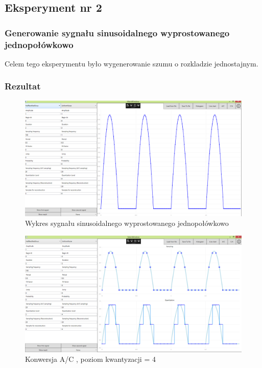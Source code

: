 \documentclass[12pt]{article}
\begin{document}


\subsection{Eksperyment nr 2 }
\subsubsection{Generowanie sygnału sinusoidalnego wyprostowanego jednopołówkowo}
Celem tego eksperymentu było wygenerowanie szumu o rozkladzie jednostajnym.


\subsubsection{Rezultat}

\begin{figure}[H]
 \centering
 \includegraphics[width=14cm]{images/hsinline.PNG}
 \vspace{-0.3cm}
 \caption{Wykres sygnału sinusoidalnego wyprostowanego jednopołówkowo}
 \label{gui}
\end{figure}

\begin{figure}[H]
 \centering
 \includegraphics[width=14cm]{images/hsinac.PNG}
 \vspace{-0.3cm}
 \caption{Konwersja A/C , poziom kwantyzacji = 4}
 \label{gui}
\end{figure}
\end{document}
